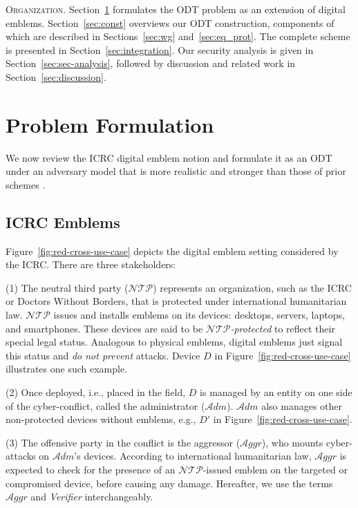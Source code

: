 \documentclass[letterpaper,twocolumn,10pt]{article}
\newcommand{\T}{\ensuremath{\mathcal{A}ggr}\xspace}
\newcommand{\N}{\ensuremath{\mathcal{N\!T}\mathcal{\!P}}\xspace}
\newcommand{\ADM}{\ensuremath{\mathcal{A}dm}\xspace}
\newcommand{\dn}{\ensuremath{D}\xspace}
\newcommand{\da}{\ensuremath{D'}\xspace}
\begin{document}
\noindent\textsc{Organization.}
Section~\ref{sec:prob} formulates the ODT problem as an extension of digital emblems.
Section~\ref{sec:const} overviews our ODT construction, components of which are described in
Sections~\ref{sec:wg} and~\ref{sec:eq_prot}. The
complete scheme is presented in Section~\ref{sec:integration}. Our {security analysis} is given
in Section~\ref{sec:sec-analysis}, followed by discussion and related work in Section~\ref{sec:discussion}.

\section{Problem Formulation}
\label{sec:prob}
We now review the ICRC digital emblem notion and formulate it as an ODT
under an adversary model that is more realistic and stronger than those of prior schemes \cite{icrc,adem}.

\subsection{ICRC Emblems}
%
Figure~\ref{fig:red-cross-use-case} depicts the digital emblem setting considered by the ICRC.
There are three stakeholders:

\noindent (1) The neutral third party (\N) represents an organization, such as the ICRC or
Doctors Without Borders, that is protected under international humanitarian law. \N issues and installs
emblems on its devices: desktops, servers, laptops, and smartphones. These devices are said to be
\emph{\N-protected} to reflect their special legal status. Analogous to physical emblems, digital emblems
just signal this status and {\it do not prevent} attacks.
Device \dn in Figure~\ref{fig:red-cross-use-case} illustrates one such example.

\noindent (2) Once deployed, i.e., placed in the field, $D$ is managed by an entity on one side of
the cyber-conflict, called the administrator (\ADM). \ADM also manages other non-protected devices without emblems,
e.g., \da in Figure~\ref{fig:red-cross-use-case}.

\noindent (3) The offensive party in the conflict is the aggressor (\T), who mounts cyber-attacks
on \ADM's devices. According to international humanitarian law, \T is expected to
check for the presence of an \N-issued emblem on the targeted or compromised device, before
causing any damage. Hereafter, we use the terms \T and \emph{Verifier} interchangeably.
\end{document}
